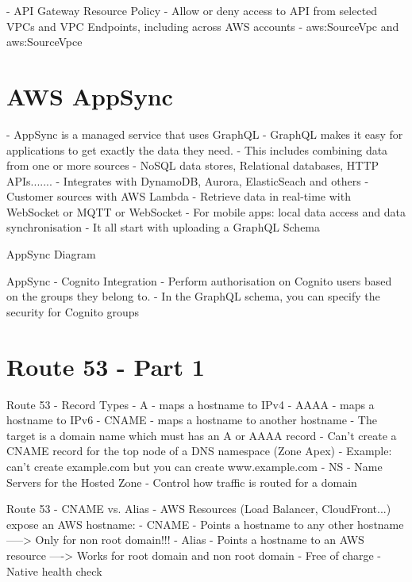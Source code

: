 \documentclass[11pt]{book}
\begin{document}
    - API Gateway Resource Policy
        - Allow or deny access to API from selected VPCs and VPC Endpoints, including across AWS accounts
        - aws:SourceVpc and aws:SourceVpce

    \section{AWS AppSync}
    - AppSync is a managed service that uses GraphQL
    - GraphQL makes it easy for applications to get exactly the data they need.
    - This includes combining data from one or more sources
        - NoSQL data stores, Relational databases, HTTP APIs.......
        - Integrates with DynamoDB, Aurora, ElasticSeach and others
        - Customer sources with AWS Lambda
    - Retrieve data in real-time with WebSocket or MQTT or WebSocket
    - For mobile apps: local data access and data synchronisation
    - It all start with uploading a GraphQL Schema

    AppSync Diagram

    AppSync - Cognito Integration
    - Perform authorisation on Cognito users based on the groups they belong to.
    - In the GraphQL schema, you can specify the security for Cognito groups

    \section{Route 53 - Part 1}
    Route 53 - Record Types
    - A - maps a hostname to IPv4
    - AAAA - maps a hostname to IPv6
    - CNAME - maps a hostname to another hostname
        - The target is a domain name which must has an A or AAAA record
        - Can't create a CNAME record for the top node of a DNS namespace (Zone Apex)
        - Example: can't create example.com but you can create www.example.com
    - NS - Name Servers for the Hosted Zone
        - Control how traffic is routed for a domain


    Route 53 - CNAME vs. Alias
    - AWS Resources (Load Balancer, CloudFront...) expose an AWS hostname:
    - CNAME
        - Points a hostname to any other hostname
        -----> Only for non root domain!!!
    - Alias
        - Points a hostname to an AWS resource
        ----> Works for root domain and non root domain
        - Free of charge
        - Native health check
\end{document}
